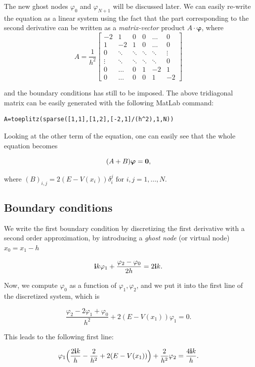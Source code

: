 \documentclass[12pt,a4paper,onecolumn]{article}
\theoremstyle{definition}
\theoremstyle{plain}
\newcommand{\var}{\varphi}
\renewcommand{\phi}{\varphi}
\begin{document}
The new ghost nodes $\phi_0$ and $\phi_{N+1}$ will be discussed later. We can easily re-write the equation as a linear system using the fact that the part corresponding to the second derivative can be written as a \emph{matrix-vector} product $ A \cdot \boldsymbol{\var} $,
where\[A= \frac{1}{h^2}
\begin{bmatrix}
-2& 1 & 0 & 0 & \dots & 0 \\
1 & -2 & 1 & 0 & \dots & 0 \\
0 & \ddots & \ddots & \ddots & \ddots & \vdots \\
\vdots & \ddots & \ddots & \ddots & \ddots & 0 \\
0 & \dots & 0 & 1 & -2 & 1 \\
0 & \dots & 0 & 0 & 1 & -2
\end{bmatrix} 
\]

and the boundary conditions has still to be imposed. The above tridiagonal matrix can be easily generated with the following MatLab command:
\begin{verbatim}
A=toeplitz(sparse([1,1],[1,2],[-2,1]/(h^2),1,N))
\end{verbatim}

Looking at the other term of the equation, one can easily see that the whole equation becomes

\[ (A+B) \boldsymbol{\var} = \bold{0},\]

where $(B)_{i,j}=2(E-V(x_i)) \delta_{i}^{j}\text{ for } i,j=1,\dots,N$.




\subsection{Boundary conditions}

We write the first boundary condition by discretizing the first derivative with a second order approximation, by introducing a \emph{ghost node} (or virtual node) $x_0=x_1-h$


\[ \bold{i} k \var_1+ \frac{\var_2-\var_0}{2h}=2 \bold{i} k. \]

Now, we compute $\var_0$ as a function of $\var_1, \var_2$, and we put it into the first line of the discretized system, which is 

\[ \frac{\var_2 - 2\var_1+\var_0}{h^2}+ 2(E-V(x_1))\var_1=0.\]


This leads to the following first line:  

\[ \var_1 \Big(\frac{2 \bold{i}k}{h}-\frac{2}{h^2}+2(E-V(x_1))\Big) + \frac{2}{h^2}\var_2=\frac{4 \bold{i}k}{h}.\]
\end{document}
